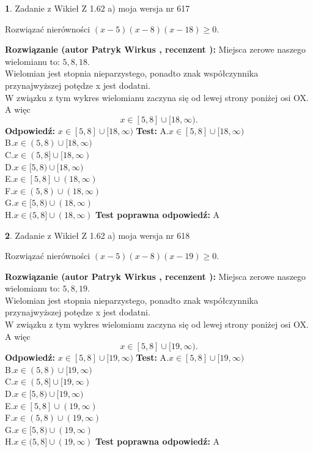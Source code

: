 \documentclass[12pt, a4paper]{article}
\theoremstyle{definition} %
\newtheorem{zad}{}
\newcommand{\zadStart}[1]{\begin{zad}#1\newline}
\newcommand{\zadStop}{\end{zad}}
\newcommand{\rozwStart}[2]{\noindent \textbf{Rozwiązanie (autor #1 , recenzent #2): }\newline}
\newcommand{\rozwStop}{\newline}
\newcommand{\odpStart}{\noindent \textbf{Odpowiedź:}\newline}
\newcommand{\odpStop}{\newline}
\newcommand{\testStart}{\noindent \textbf{Test:}\newline}
\newcommand{\testStop}{\newline}
\newcommand{\kluczStart}{\noindent \textbf{Test poprawna odpowiedź:}\newline}
\newcommand{\kluczStop}{\newline}
\begin{document}
\zadStart{Zadanie z Wikieł Z 1.62 a) moja wersja nr 617}

Rozwiązać nierówności $(x-5)(x-8)(x-18)\ge0$.
\zadStop
\rozwStart{Patryk Wirkus}{}
Miejsca zerowe naszego wielomianu to: $5, 8, 18$.\\
Wielomian jest stopnia nieparzystego, ponadto znak współczynnika przy\linebreak najwyższej potędze x jest dodatni.\\ W związku z tym wykres wielomianu zaczyna się od lewej strony poniżej osi OX. A więc $$x \in [5,8] \cup [18,\infty).$$
\rozwStop
\odpStart
$x \in [5,8] \cup [18,\infty)$
\odpStop
\testStart
A.$x \in [5,8] \cup [18,\infty)$\\
B.$x \in (5,8) \cup [18,\infty)$\\
C.$x \in (5,8] \cup [18,\infty)$\\
D.$x \in [5,8) \cup [18,\infty)$\\
E.$x \in [5,8] \cup (18,\infty)$\\
F.$x \in (5,8) \cup (18,\infty)$\\
G.$x \in [5,8) \cup (18,\infty)$\\
H.$x \in (5,8] \cup (18,\infty)$
\testStop
\kluczStart
A
\kluczStop



\zadStart{Zadanie z Wikieł Z 1.62 a) moja wersja nr 618}

Rozwiązać nierówności $(x-5)(x-8)(x-19)\ge0$.
\zadStop
\rozwStart{Patryk Wirkus}{}
Miejsca zerowe naszego wielomianu to: $5, 8, 19$.\\
Wielomian jest stopnia nieparzystego, ponadto znak współczynnika przy\linebreak najwyższej potędze x jest dodatni.\\ W związku z tym wykres wielomianu zaczyna się od lewej strony poniżej osi OX. A więc $$x \in [5,8] \cup [19,\infty).$$
\rozwStop
\odpStart
$x \in [5,8] \cup [19,\infty)$
\odpStop
\testStart
A.$x \in [5,8] \cup [19,\infty)$\\
B.$x \in (5,8) \cup [19,\infty)$\\
C.$x \in (5,8] \cup [19,\infty)$\\
D.$x \in [5,8) \cup [19,\infty)$\\
E.$x \in [5,8] \cup (19,\infty)$\\
F.$x \in (5,8) \cup (19,\infty)$\\
G.$x \in [5,8) \cup (19,\infty)$\\
H.$x \in (5,8] \cup (19,\infty)$
\testStop
\kluczStart
A
\kluczStop
\end{document}
